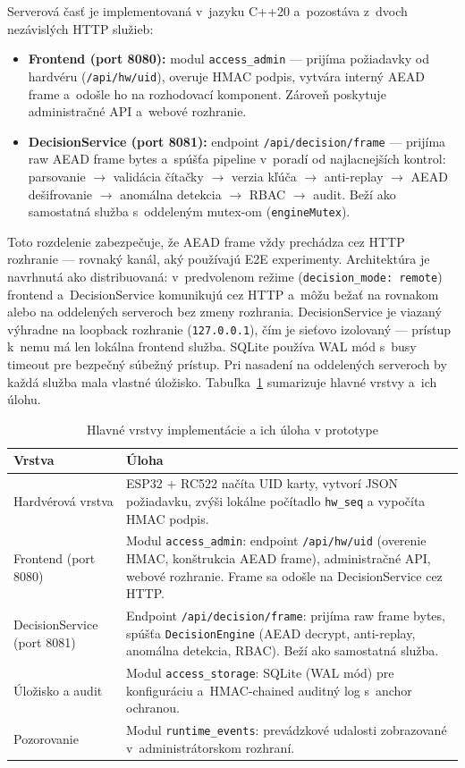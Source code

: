Serverová časť je implementovaná v~jazyku C++20 a~pozostáva z~dvoch nezávislých HTTP služieb:
\begin{itemize}[leftmargin=*,itemsep=2pt]
  \item \textbf{Frontend (port 8080):} modul \texttt{access\_admin} --- prijíma požiadavky od hardvéru (\texttt{/api/hw/uid}), overuje HMAC podpis, vytvára interný AEAD frame a~odošle ho na rozhodovací komponent. Zároveň poskytuje administračné API a~webové rozhranie.
  \item \textbf{DecisionService (port 8081):} endpoint \texttt{/api/decision/frame} --- prijíma raw AEAD frame bytes a~spúšťa pipeline v~poradí od najlacnejších kontrol: parsovanie $\rightarrow$ validácia čítačky $\rightarrow$ verzia kľúča $\rightarrow$ anti-replay $\rightarrow$ AEAD dešifrovanie $\rightarrow$ anomálna detekcia $\rightarrow$ RBAC $\rightarrow$ audit. Beží ako samostatná služba s~oddeleným mutex-om (\texttt{engineMutex}).
\end{itemize}

Toto rozdelenie zabezpečuje, že AEAD frame vždy prechádza cez HTTP rozhranie --- rovnaký kanál, aký používajú E2E experimenty. Architektúra je navrhnutá ako distribuovaná: v~predvolenom režime (\texttt{decision\_mode: remote}) frontend a~DecisionService komunikujú cez HTTP a~môžu bežať na rovnakom alebo na oddelených serveroch bez zmeny rozhrania. DecisionService je viazaný výhradne na loopback rozhranie (\texttt{127.0.0.1}), čím je sieťovo izolovaný --- prístup k~nemu má len lokálna frontend služba\cite{NIST80053}. SQLite používa WAL mód s~busy timeout pre bezpečný súbežný prístup. Pri nasadení na oddelených serveroch by každá služba mala vlastné úložisko. Tabuľka~\ref{tab:impl_layers} sumarizuje hlavné vrstvy a~ich úlohu.

\begin{table}[H]
\renewcommand{\arraystretch}{1.3}
\centering
\caption{Hlavné vrstvy implementácie a ich úloha v prototype}
\label{tab:impl_layers}
\begin{tabular}{|p{3.0cm}|p{9.0cm}|}
\hline
\textbf{Vrstva} & \textbf{Úloha} \\
\hline
Hardvérová vrstva & ESP32 + RC522 načíta UID karty, vytvorí JSON požiadavku, zvýši lokálne počítadlo \texttt{hw\_seq} a vypočíta HMAC podpis. \\
\hline
Frontend (port 8080) & Modul \texttt{access\_admin}: endpoint \texttt{/api/hw/uid} (overenie HMAC, konštrukcia AEAD frame), administračné API, webové rozhranie. Frame sa odošle na DecisionService cez HTTP. \\
\hline
DecisionService (port 8081) & Endpoint \texttt{/api/decision/frame}: prijíma raw frame bytes, spúšťa \texttt{DecisionEngine} (AEAD decrypt, anti-replay, anomálna detekcia, RBAC). Beží ako samostatná služba. \\
\hline
Úložisko a audit & Modul \texttt{access\_storage}: SQLite (WAL mód) pre konfiguráciu a~HMAC-chained auditný log s~anchor ochranou. \\
\hline
Pozorovanie & Modul \texttt{runtime\_events}: prevádzkové udalosti zobrazované v~administrátorskom rozhraní. \\
\hline
\end{tabular}
\end{table}


